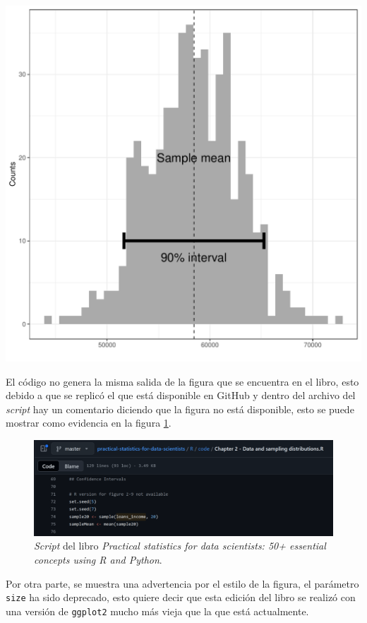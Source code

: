 \documentclass[12pt]{article}\usepackage[]{graphicx}\usepackage[]{xcolor}
\makeatletter
\def\maxwidth{ %
  \ifdim\Gin@nat@width>\linewidth
    \linewidth
  \else
    \Gin@nat@width
  \fi
}
\newenvironment{kframe}{%
 \def\at@end@of@kframe{}%
 \ifinner\ifhmode%
  \def\at@end@of@kframe{\end{minipage}}%
  \begin{minipage}{\columnwidth}%
 \fi\fi%
 \def\FrameCommand##1{\hskip\@totalleftmargin \hskip-\fboxsep
 \colorbox{shadecolor}{##1}\hskip-\fboxsep
     \hskip-\linewidth \hskip-\@totalleftmargin \hskip\columnwidth}%
 \MakeFramed {\advance\hsize-\width
   \@totalleftmargin\z@ \linewidth\hsize
   \@setminipage}}%
 {\par\unskip\endMakeFramed%
 \at@end@of@kframe}
\newenvironment{knitrout}{}{} %
\makeatother
\begin{document}
\begin{knitrout}
\begin{kframe}
{\ttfamily\noindent\color{warningcolor}{\#\# Warning: Using `size` aesthetic for lines was deprecated in ggplot2 3.4.0.\\\#\# i Please use `linewidth` instead.\\\#\# This warning is displayed once every 8 hours.\\\#\# Call `lifecycle::last\_lifecycle\_warnings()` to see where this warning was\\\#\# generated.}}\end{kframe}
\includegraphics[width=\maxwidth]{figure/unnamed-chunk-14-1} 
\end{knitrout}

El código no genera la misma salida de la figura que se encuentra en el libro, esto debido a que se replicó el que está disponible en GitHub y dentro del archivo del \textit{script} hay un comentario diciendo que la figura no está disponible, esto se puede mostrar como evidencia en la figura \ref{fig:GH}.

\begin{figure}[ht]
  \centering
  \includegraphics[width=\textwidth]{img/Punto7.png}
  \caption{\label{fig:GH} \textit{Script} del libro \textit{Practical statistics for data scientists: 50+ essential concepts using R and Python}\cite{bruce2020practical}.}
\end{figure}

Por otra parte, se muestra una advertencia por el estilo de la figura, el parámetro \lstinline|size| ha sido deprecado, esto quiere decir que esta edición del libro se realizó con una versión de \lstinline|ggplot2| mucho más vieja que la que está actualmente.




\printbibliography
\end{document}
